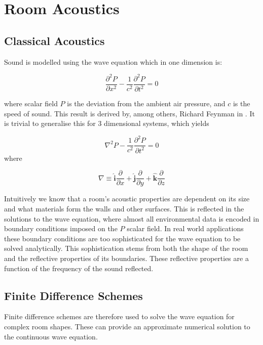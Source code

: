 \documentclass[12pt,a4paper]{report}
\begin{document}
\section{Room Acoustics}
\label{section:acoustics}
\subsection{Classical Acoustics}
Sound is modelled using the wave equation which in one dimension is:

\begin{equation}
\frac{\partial ^2 P}{\partial x^2 } - \frac{1}{{c^2 }}\frac{{\partial ^2 P}}{{\partial t^2 }} = 0
\end{equation}

where scalar field $P$ is the deviation from the ambient air pressure, and $c$ is the speed of sound. This result is derived by, among others, Richard Feynman in \cite{feynman}. It is trivial to generalise this for 3 dimensional systems, which yields

\begin{equation}
\label{equation:wave}
\nabla^{2} P - \frac{1}{{c^2 }}\frac{{\partial ^2 P}}{{\partial t^2 }} = 0
\end{equation}
where

\begin{equation}
\label{equation:laplace}
\nabla \equiv \hat{ \textbf{i}} \frac{\partial}{\partial x} + \hat{ \textbf{j}} \frac{\partial }{\partial y} + \hat{ \textbf{k}} \frac{\partial }{\partial z}
\end{equation}

Intuitively we know that a room's acoustic properties are dependent on its size and what materials form the walls and other surfaces. This is reflected in the solutions to the wave equation, where almost all environmental data is encoded in boundary conditions imposed on the $P$ scalar field. In real world applications these boundary conditions are too sophisticated for the wave equation to be solved analytically. This sophistication stems from both the shape of the room and the reflective properties of its boundaries. These reflective properties are a function of the frequency of the sound reflected.

\subsection{Finite Difference Schemes}

Finite difference schemes are therefore used to solve the wave equation for complex room shapes. These can provide an approximate numerical solution to the continuous wave equation.
\end{document}
